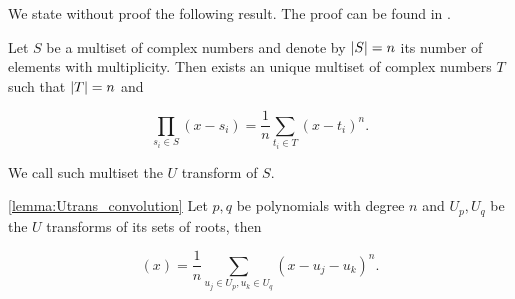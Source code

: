 We state without proof the following result. The proof  can be found in \cite{anaya2016cumulantes}.

\begin{lemma}
    Let $S$ be a multiset of complex numbers and denote by $\lvert S \rvert=n$ its number of elements with multiplicity. Then exists an unique multiset of complex numbers $T$ such that $\lvert T \rvert=n$ and 

    \begin{equation*}
        \prod_{s_i \in S} (x-s_i) = \frac 1n \sum_{t_i \in T} (x-t_i)^n.
    \end{equation*}

    We call such multiset the $U$ transform of $S$.
\end{lemma}




\begin{lemma} \ref{lemma:Utrans_convolution}
    Let $p,q$ be polynomials with degree $n$ and $U_p,U_q$ be the $U$ transforms of its sets of roots, then

    \begin{equation*}
        [p \boxplus_n q](x) = \frac1n \sum_{u_j \in U_p, u_k \in U_q} (x - u_j -u_k)^n.
    \end{equation*}
\end{lemma}

